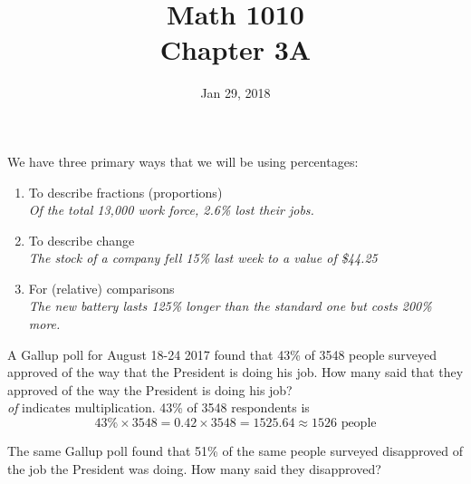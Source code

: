 \documentclass[12pt]{article}
\begin{document}
\title{\bf Math 1010 \\ Chapter 3A}
\date{Jan 29, 2018}
\maketitle







We have three primary ways that we will be using percentages:
\begin{enumerate}
\item To describe fractions (proportions)\\
\emph{Of the total 13,000 work force, 2.6\% lost their jobs.}
\item To describe change\\
\emph{The stock of a company fell 15\% last week to a value of \$44.25}
\item For (relative) comparisons\\
\emph{The new battery lasts 125\% longer than the standard one but costs 200\% more.}
\end{enumerate}


A Gallup poll for August 18-24 2017 found that 43\% of 3548 people surveyed approved of the way that the President is doing his job. How many said that they approved of the way the President is doing his job?\\

\emph{of} indicates multiplication. 43\% of 3548 respondents is 
\[
43\% \times 3548 = 0.42 \times 3548 = 1525.64 \approx 1526 \text{ people}
\]

The same Gallup poll found that 51\% of the same people surveyed disapproved of the job the President was doing. How many said they disapproved?
\vspace{0.5in}

\end{document}
